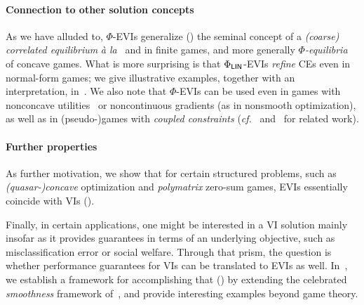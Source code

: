 \paragraph{Connection to other solution concepts}

As we have alluded to, $\Phi$-EVIs generalize () the seminal concept of a \emph{(coarse) correlated equilibrium} \emph{\`a la}~\citet{Aumann74:Subjectivity} and \citet{Moulin78:Strategically} in finite games, and more generally \emph{$\Phi$-equilibria}~\citep{Greenwald03:General,Stoltz07:Learning,Gordon08:No} of concave games. %
What is more surprising is that $\Phi_\mathsf{LIN}$-EVIs \emph{refine} CEs even in normal-form games; we give illustrative examples, together with an interpretation, in~. We also note that $\Phi$-EVIs can be used even in games with nonconcave utilities~\citep{Daskalakis22:Non,Cai24:Tractable,Ahunbay25:First} or noncontinuous gradients (as in nonsmooth optimization), as well as in (pseudo-)games with \emph{coupled constraints} (\emph{cf.}~\citealp{Bernasconi23:Constrained} and~ for related work).


\paragraph{Further properties} As further motivation, we show that for certain structured problems, such as \emph{(quasar-)concave} optimization and \emph{polymatrix} zero-sum games, EVIs essentially coincide with VIs (). %

Finally, in certain applications, one might be interested in a VI solution mainly insofar as it provides guarantees in terms of an underlying objective, such as misclassification error or social welfare. Through that prism, the question is whether performance guarantees for VIs can be translated to EVIs as well. In~, we establish a framework for accomplishing that () by extending the celebrated \emph{smoothness} framework of~\citet{Roughgarden15:Intrinsic}, and provide interesting examples beyond game theory.

